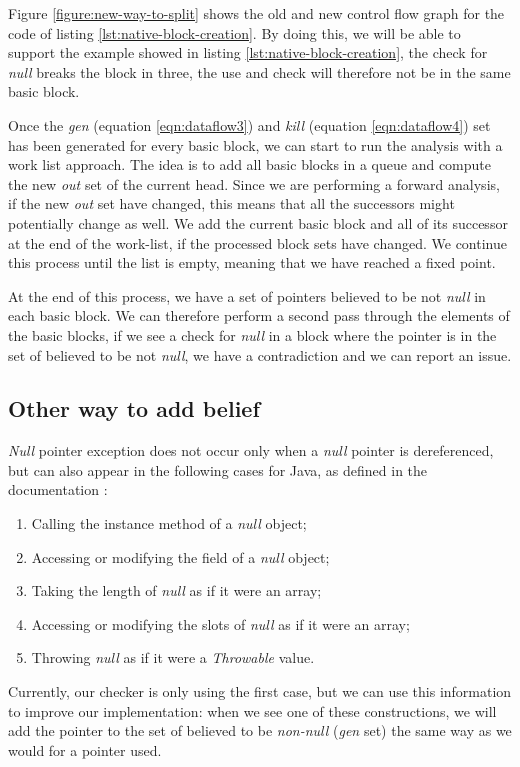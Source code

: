 Figure \ref{figure:new-way-to-split} shows the old and new control flow graph for the code of listing \ref{lst:native-block-creation}. 
By doing this, we will be able to support the example showed in listing \ref{lst:native-block-creation}, the check for \emph{null} breaks the block in three, the use and check will therefore not be in the same basic block.

Once the \emph{gen} (equation \eqref{eqn:dataflow3}) and \emph{kill} (equation \eqref{eqn:dataflow4}) set has been generated for every basic block, we can start to run the analysis with a work list approach.
The idea is to add all basic blocks in a queue and compute the new \emph{out} set of the current head. 
Since we are performing a forward analysis, if the new \emph{out} set have changed, this means that all the successors might potentially change as well. 
We add the current basic block and all of its successor at the end of the work-list, if the processed block sets have changed. 
We continue this process until the list is empty, meaning that we have reached a fixed point.

At the end of this process, we have a set of pointers believed to be not \emph{null} in each basic block.
We can therefore perform a second pass through the elements of the basic blocks, if we see a check for \emph{null} in a block where the pointer is in the set of believed to be not \emph{null}, we have a contradiction and we can report an issue.

\subsection{Other way to add belief}
\label{subsec:other_way_to_add_belief}

\emph{Null} pointer exception does not occur only when a \emph{null} pointer is dereferenced, but can also appear in the following cases for Java, as defined in the documentation \cite{OracleDoc:2019:Online}:

\begin{enumerate}
	\item Calling the instance method of a \emph{null} object;
	\item Accessing or modifying the field of a \emph{null} object;
	\item Taking the length of \emph{null} as if it were an array;
	\item Accessing or modifying the slots of \emph{null} as if it were an array;
	\item Throwing \emph{null} as if it were a \emph{Throwable} value.
\end{enumerate}
Currently, our checker is only using the first case, but we can use this information to improve our implementation: when we see one of these constructions, we will add the pointer to the set of believed to be \emph{non-null} (\emph{gen} set) the same way as we would for a pointer used.


